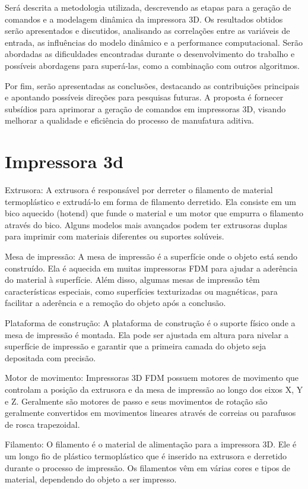Será descrita a metodologia utilizada, descrevendo as
etapas para a geração de comandos e a modelagem dinâmica da impressora 3D. Os resultados obtidos serão 
apresentados e discutidos, analisando as correlações entre as variáveis de entrada, as influências do 
modelo dinâmico e a performance computacional. Serão abordadas as dificuldades encontradas durante o 
desenvolvimento do trabalho e possíveis abordagens para superá-las, como a combinação com outros algoritmos.

Por fim, serão apresentadas as conclusões, destacando as contribuições principais e apontando possíveis 
direções para pesquisas futuras. A proposta é fornecer subsídios para aprimorar a geração de comandos em 
impressoras 3D, visando melhorar a qualidade e eficiência do processo de manufatura aditiva.

\section{Impressora 3d}

Extrusora: A extrusora é responsável por derreter o filamento de material termoplástico e extrudá-lo 
em forma de filamento derretido. 
Ela consiste em um bico aquecido (hotend) que funde o material e um motor que empurra o 
filamento através do bico. Alguns modelos mais avançados podem ter extrusoras duplas para 
imprimir com materiais diferentes ou suportes solúveis.

Mesa de impressão: A mesa de impressão é a superfície onde o objeto está sendo construído. 
Ela é aquecida em muitas impressoras FDM para ajudar a aderência do material à superfície. 
Além disso, algumas mesas de impressão têm características especiais, como superfícies 
texturizadas ou magnéticas, para facilitar a aderência e a remoção do objeto após a conclusão.

Plataforma de construção: A plataforma de construção é o suporte físico onde a mesa de impressão é montada. 
Ela pode ser ajustada em altura para nivelar a superfície de impressão e garantir que a primeira camada do 
objeto seja depositada com precisão.

Motor de movimento: Impressoras 3D FDM possuem motores de movimento que controlam a posição da extrusora e 
da mesa de impressão ao longo dos eixos X, Y e Z. Geralmente são motores de passo e seus movimentos de rotação
são geralmente convertidos em movimentos lineares através de correias ou parafusos de rosca trapezoidal.

Filamento: O filamento é o material de alimentação para a impressora 3D. Ele é um longo fio de plástico 
termoplástico que é inserido na extrusora e derretido durante o processo de impressão. Os filamentos vêm 
em várias cores e tipos de material, dependendo do objeto a ser impresso.

